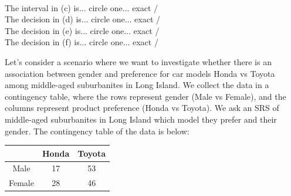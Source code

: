 \documentclass[12pt]{article}
\begin{document}
\begin{enumerate}[(a)]
 \\
The interval in (c) is... circle one... exact \quad / \quad \iftoggle{solutions}{\inred{approximate.}}{approximate.} \\
The decision in (d) is... circle one... exact \quad / \quad \iftoggle{solutions}{\inred{approximate.}}{approximate.} \\
The decision in (e) is... circle one... exact \quad / \quad \iftoggle{solutions}{\inred{approximate.}}{approximate.} \\
The decision in (f) is... circle one... exact \quad / \quad \iftoggle{solutions}{\inred{approximate.}}{approximate.}
\pagebreak
\end{enumerate}



\problem Let's consider a scenario where we want to investigate whether there is an association between gender and preference for car models Honda vs Toyota among middle-aged suburbanites in Long Island. We collect the data in a contingency table, where the rows represent gender (Male vs Female), and the columns represent product preference (Honda vs Toyota). We ask an SRS of middle-aged suburbanites in Long Island which model they prefer and their gender. The contingency table of the data is below:

\begin{table}[htp]
    \centering
    \begin{tabular}{c|cc}
 & Honda & Toyota \\
\hline
Male & 17 & 53 \\
Female & 28 & 46 \\
    \end{tabular}
\end{table}
\end{document}

